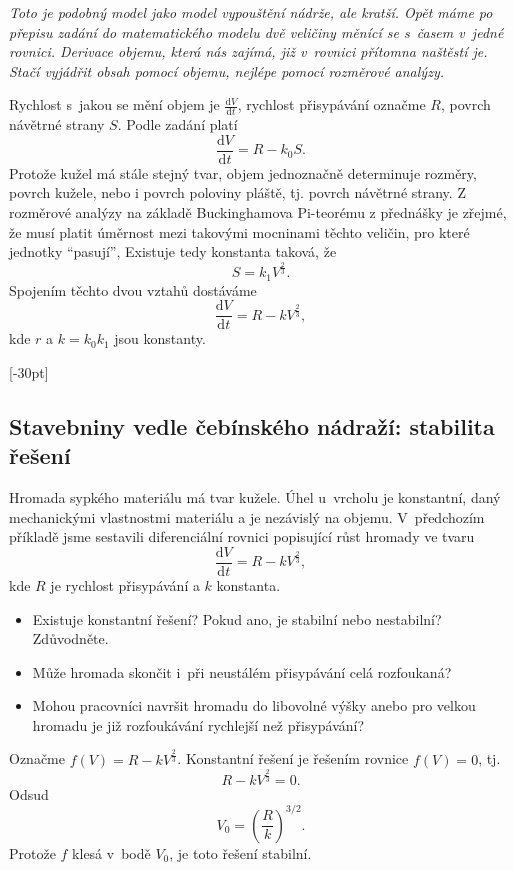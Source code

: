 \textit{Toto je podobný model jako model vypouštění nádrže, ale kratší. Opět máme po přepisu zadání do matematického modelu dvě veličiny měnící se s časem v jedné rovnici. Derivace objemu, která nás zajímá, již v rovnici přítomna naštěstí je. Stačí vyjádřit obsah pomocí objemu, nejlépe pomocí rozměrové analýzy.}

\reseni
Rychlost s jakou se mění objem je $\frac{\mathrm dV}{\mathrm dt}$, rychlost přisypávání označme $R$, povrch návětrné strany $S$.
Podle zadání platí
$$  \frac{\mathrm dV}{\mathrm dt} = R - k_0S.$$
Protože kužel má stále stejný tvar, objem jednoznačně determinuje rozměry, povrch kužele, nebo i povrch poloviny pláště, tj. povrch návětrné strany. Z rozměrové analýzy na základě Buckinghamova Pi-teorému z přednášky je zřejmé, že musí platit úměrnost mezi takovými mocninami těchto veličin, pro které jednotky ``pasují'', Existuje tedy konstanta taková, že $$S=k_1V^{\frac 23}.$$ Spojením těchto dvou vztahů dostáváme
$$  \frac{\mathrm dV}{\mathrm dt} = R - k V^{\frac 23},$$
kde $r$ a $k=k_0k_1$ jsou konstanty.

\konec




[-30pt]

\subsection{Stavebniny vedle čebínského nádraží: stabilita řešení}

Hromada sypkého materiálu má tvar kužele. Úhel u~vrcholu je konstantní, daný
mechanickými vlastnostmi materiálu a je nezávislý na
objemu. V předchozím příkladě jsme sestavili diferenciální rovnici popisující růst hromady ve tvaru
$$\frac{\mathrm dV}{\mathrm dt}=R-kV^{\frac 23},$$
kde $R$ je rychlost přisypávání a $k$ konstanta.
\vspace*{25pt}
\begin{itemize}
\item Existuje konstantní řešení? Pokud ano, je stabilní nebo nestabilní? Zdůvodněte.
\item Může hromada skončit i při neustálém přisypávání celá rozfoukaná?
\item Mohou pracovníci navršit hromadu do libovolné výšky anebo pro velkou hromadu je již rozfoukávání rychlejší než přisypávání?
\end{itemize}

\reseni
Označme $f(V)=R-kV^{\frac 23}$.
Konstantní řešení je řešením rovnice $f(V)=0$, tj. $$R-kV^{\frac 23}=0.$$ Odsud
$$V_0=\left(\frac{R}{k}\right)^{3/2}.$$ Protože $f$ klesá v bodě $V_0$, je toto řešení stabilní.

